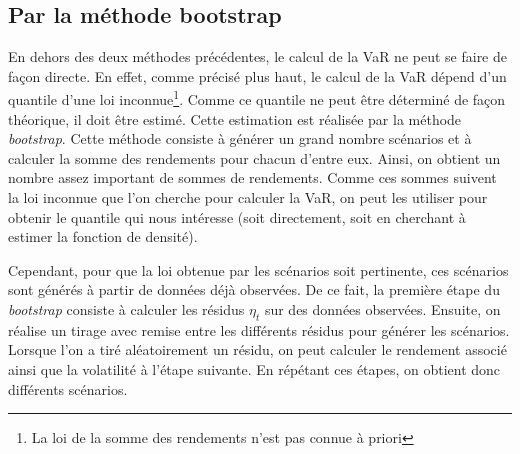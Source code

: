 		\subsection{Par la méthode bootstrap}
		\label{subsubsection:methode-bootstrap}
			En dehors des deux méthodes précédentes, le calcul de la VaR ne peut se faire de façon directe. En effet, comme précisé plus haut, le calcul de la VaR dépend d'un quantile d'une loi inconnue\footnote{La loi de la somme des rendements n'est pas connue à priori}. Comme ce quantile ne peut être déterminé de façon théorique, il doit être estimé. Cette estimation est réalisée par la méthode \textit{bootstrap}. Cette méthode consiste à générer un grand nombre scénarios et à calculer la somme des rendements pour chacun d'entre eux. Ainsi, on obtient un nombre assez important de sommes de rendements. Comme ces sommes suivent la loi inconnue que l'on cherche pour calculer la VaR, on peut les utiliser pour obtenir le quantile qui nous intéresse (soit directement, soit en cherchant à estimer la fonction de densité).

			Cependant, pour que la loi obtenue par les scénarios soit pertinente, ces scénarios sont générés à partir de données déjà observées. De ce fait, la première étape du \textit{bootstrap} consiste à calculer les résidus $\eta_t$ sur des données observées. Ensuite, on réalise un tirage avec remise entre les différents résidus pour générer les scénarios. Lorsque l'on a tiré aléatoirement un résidu, on peut calculer le rendement associé ainsi que la volatilité à l'étape suivante. En répétant ces étapes, on obtient donc différents scénarios.